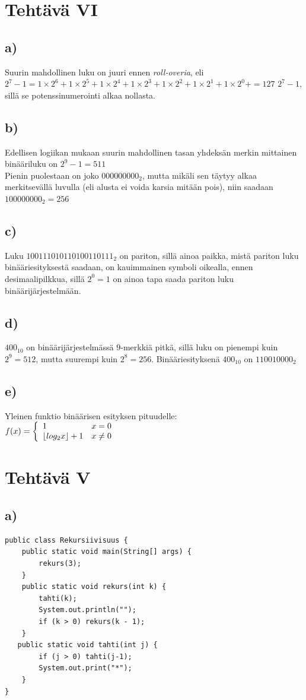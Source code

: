 \documentclass[a4paper, 12pt]{article}
\begin{document}
\section*{Tehtävä VI}
\subsection*{a)}
Suurin mahdollinen luku on juuri ennen \emph{roll-overia}, eli $2^{7}-1=1 \times 2^6 +1 \times 2^5 +1 \times 2^4 +1 \times 2^3 +1 \times 2^2 +1 \times 2^1 +1 \times 2^0 +=127$
$2^{7}-1$, sillä se potenssinumerointi alkaa nollasta.
\subsection*{b)}
Edellisen logiikan mukaan suurin mahdollinen tasan yhdeksän merkin mittainen binääriluku on $2^9-1=511$\\
Pienin puolestaan on joko $000000000_2$, mutta mikäli sen täytyy alkaa merkitsevällä luvulla (eli alusta ei voida karsia mitään pois), niin saadaan $100000000_2=256$
\subsection*{c)}
Luku $100111010110100110111_2$ on pariton, sillä ainoa paikka, mistä pariton luku binääriesityksestä saadaan, on kauimmainen symboli oikealla, ennen desimaalipilkkua, sillä $2^0=1$ on ainoa tapa saada pariton luku binäärijärjestelmään.
\subsection*{d)}
$400_{10}$ on binäärijärjestelmässä $9$-merkkiä pitkä, sillä luku on pienempi kuin $2^9=512$, mutta suurempi kuin $2^8=256$. Binääriesityksenä $400_{10}$ on $110010000_2$
\subsection*{e)}
Yleinen funktio binäärisen esityksen pituudelle: \\
$f(x) = \left\{
   \begin{array}{l l}
    1 & x = 0 \\
    \lfloor log_2 x\rfloor +1 & x \neq 0
  \end{array} \right.
$
\section*{Tehtävä V}
\subsection*{a)}
\begin{lstlisting}
public class Rekursiivisuus {
    public static void main(String[] args) {
        rekurs(3);
    }
    public static void rekurs(int k) {
        tahti(k);
        System.out.println("");
        if (k > 0) rekurs(k - 1);
    }
   public static void tahti(int j) {
        if (j > 0) tahti(j-1);   
        System.out.print("*");
    }
}
\end{lstlisting}
\end{document}
